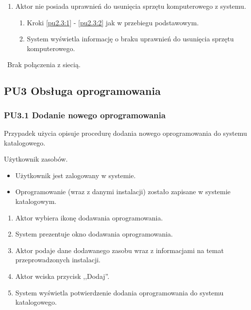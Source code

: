 \begin{enumerate}
\item Aktor nie posiada uprawnień do usunięcia sprzętu komputerowego z systemu.
	\begin{enumerate}[label*=\arabic*.]
		\item Kroki \ref{pu2.3:1} - \ref{pu2.3:2} jak w przebiegu podstawowym.
		\item System wyświetla informację o braku uprawnień do usunięcia sprzętu komputerowego.
	\end{enumerate}
\end{enumerate}

\
Brak połączenia z siecią.

\subsection{PU3 Obsługa oprogramowania} \label{pu3}
\subsubsection{PU3.1 Dodanie nowego oprogramowania}

Przypadek użycia opisuje procedurę dodania nowego oprogramowania do systemu katalogowego.

Użytkownik zasobów.

\begin{itemize}
\item Użytkownik jest zalogowany w systemie.
\end{itemize}

\begin{itemize}
\item Oprogramowanie (wraz z danymi instalacji) zostało zapisane w systemie katalogowym.
\end{itemize}

\begin{enumerate}
\item \label{pu3.1:1} Aktor wybiera ikonę dodawania oprogramowania.
\item System prezentuje okno dodawania oprogramowania.
\item Aktor podaje dane dodawanego zasobu wraz z informacjami na temat przeprowadzonych instalacji.
\item \label{pu3.1:4} Aktor wciska przycisk ,,Dodaj''.
\item System wyświetla potwierdzenie dodania oprogramowania do systemu katalogowego.
\end{enumerate}

